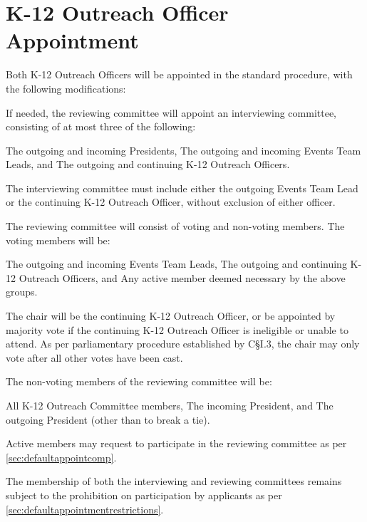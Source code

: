 \section{K-12 Outreach Officer Appointment}
Both K-12 Outreach Officers will be appointed in the standard procedure, with the following modifications:
\begin{enumsubsection}
\itemnotoc If needed, the reviewing committee will appoint an interviewing committee, consisting of at most three of the following:
\begin{enumsubsubsection}
\itemnotoc The outgoing and incoming Presidents,
\itemnotoc The outgoing and incoming Events Team Leads, and
\itemnotoc The outgoing and continuing K-12 Outreach Officers.
\end{enumsubsubsection}
The interviewing committee must include either the outgoing Events Team Lead or the continuing K-12 Outreach Officer, without exclusion of either officer.

\itemnotoc The reviewing committee will consist of voting and non-voting members.
The voting members will be:
\begin{enumsubsubsection}
\itemnotoc The outgoing and incoming Events Team Leads,
\itemnotoc The outgoing and continuing K-12 Outreach Officers, and
\itemnotoc Any active member deemed necessary by the above groups.
\end{enumsubsubsection}
The chair will be the continuing K-12 Outreach Officer, or be appointed by majority vote if the continuing K-12 Outreach Officer is ineligible or unable to attend.
As per parliamentary procedure established by C§I.3, the chair may only vote after all other votes have been cast.

\itemnotoc The non-voting members of the reviewing committee will be:
\begin{enumsubsubsection}
\itemnotoc All K-12 Outreach Committee members,
\itemnotoc The incoming President, and
\itemnotoc The outgoing President (other than to break a tie).
\end{enumsubsubsection}

\itemnotoc Active members may request to participate in the reviewing committee as per \textsection \ref{sec:defaultappointcomp}.

\itemnotoc The membership of both the interviewing and reviewing committees remains subject to the prohibition on participation by applicants as per \textsection \ref{sec:defaultappointmentrestrictions}.

\end{enumsubsection}

